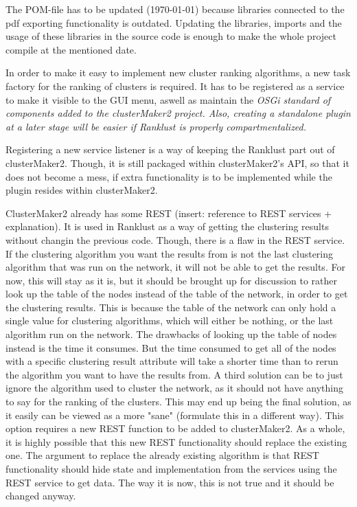 \documentclass[UKenglish,11pt,a4paper]{article}
\begin{document}
The POM-file has to be updated (\today) because libraries connected to the pdf exporting functionality is
outdated. Updating the libraries, imports and the usage of these libraries in the source code is enough to make the
whole project compile at the mentioned date.

In order to make it easy to implement new cluster ranking algorithms, a new task factory for the ranking of clusters is
required. It has to be registered as a service to make it visible to the GUI menu, aswell as maintain the \it{OSGi}
standard of components added to the \it{clusterMaker2} project. Also, creating a standalone plugin at a later stage will be
easier if Ranklust is properly compartmentalized.

Registering a new service listener is a way of keeping the Ranklust part out of clusterMaker2. Though, it is still
packaged within clusterMaker2's API, so that it does not become a mess, if extra functionality is to be implemented
while the plugin resides within clusterMaker2.

ClusterMaker2 already has some REST (insert: reference to REST services + explanation). It is used in Ranklust as a way
of getting the clustering results without changin the previous code. Though, there is a flaw in the REST service. If the
clustering algorithm you want the results from is not the last clustering algorithm that was run on the network, it will
not be able to get the results. For now, this will stay as it is, but it should be brought up for discussion to rather
look up the table of the nodes instead of the table of the network, in order to get the clustering results. This is
because the table of the network can only hold a single value for clustering algorithms, which will either be nothing,
or the last algorithm run on the network. The drawbacks of looking up the table of nodes instead is the time it
consumes. But the time consumed to get all of the nodes with a specific clustering result attribute will take a shorter
time than to rerun the algorithm you want to have the results from. A third solution can be to just ignore the algorithm
used to cluster the network, as it should not have anything to say for the ranking of the clusters. This may end up
being the final solution, as it easily can be viewed as a more "sane" (formulate this in a different way). This option
requires a new REST function to be added to clusterMaker2. As a whole, it is highly possible that this new REST
functionality should replace the existing one. The argument to replace the already existing algorithm is that REST
functionality should hide state and implementation from the services using the REST service to get data. The way it is
now, this is not true and it should be changed anyway.
\end{document}
